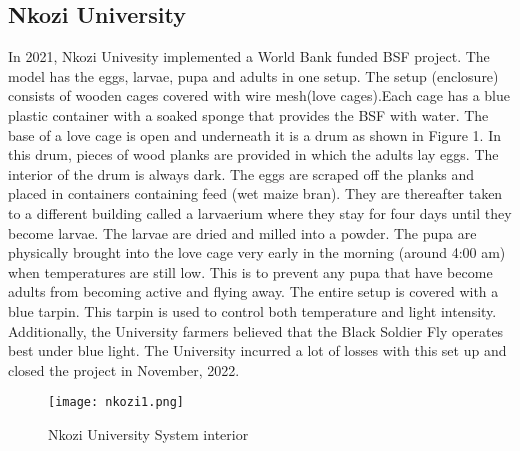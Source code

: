 \documentclass[conference]{IEEEtran}
\begin{document}
\subsection{Nkozi University}
In 2021, Nkozi Univesity implemented a World Bank funded BSF project. The
model has the eggs, larvae, pupa and adults in one setup. The setup (enclosure) consists of wooden
cages covered with wire mesh(love cages).Each cage has a blue plastic container with a soaked sponge that
provides the BSF with water. The base of a love cage is open
and underneath it is a drum as shown in Figure 1. In this drum, pieces of wood planks are provided in which the adults
lay eggs. The interior of the drum is always dark. The eggs are scraped off the planks and placed
in containers containing feed (wet maize bran). They are thereafter taken to a different building
called a larvaerium where they stay for four days until they become larvae. The larvae are dried
and milled into a powder. The pupa are physically brought into the love cage very early in the
morning (around 4:00 am) when temperatures are still low. This is to prevent any pupa that have
become adults from becoming active and flying away. The entire setup is covered with a blue tarpin. This tarpin is used to control both temperature and light intensity. Additionally, the University farmers believed that the Black Soldier Fly operates best under blue light. The University incurred a lot of losses with this set up and closed the project in November, 2022.


\begin{figure}[h]
    \begin{center}
        \texttt{[image: nkozi1.png]}
        \caption{\large Nkozi University System interior}
    \end{center}
\end{figure}
\end{document}
